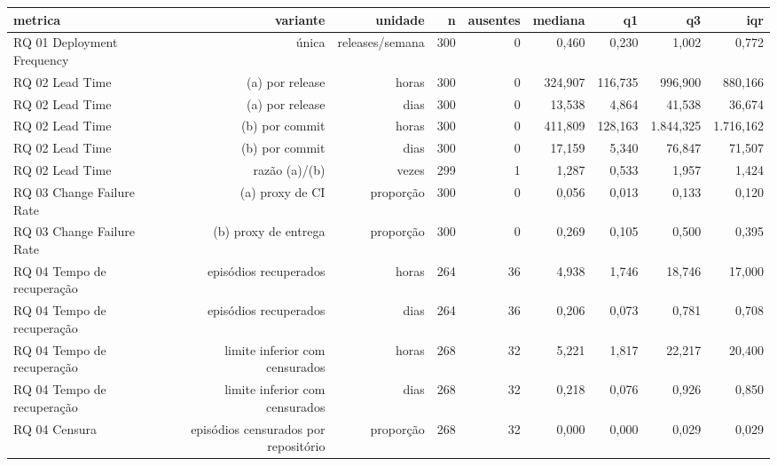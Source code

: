 \begin{tabular}{lrrrrrrrr}
\hline
metrica & variante & unidade & n & ausentes & mediana & q1 & q3 & iqr \\
\hline
RQ 01 Deployment Frequency & única & releases/semana & 300 & 0 & 0,460 & 0,230 & 1,002 & 0,772 \\
RQ 02 Lead Time & (a) por release & horas & 300 & 0 & 324,907 & 116,735 & 996,900 & 880,166 \\
RQ 02 Lead Time & (a) por release & dias & 300 & 0 & 13,538 & 4,864 & 41,538 & 36,674 \\
RQ 02 Lead Time & (b) por commit & horas & 300 & 0 & 411,809 & 128,163 & 1.844,325 & 1.716,162 \\
RQ 02 Lead Time & (b) por commit & dias & 300 & 0 & 17,159 & 5,340 & 76,847 & 71,507 \\
RQ 02 Lead Time & razão (a)/(b) & vezes & 299 & 1 & 1,287 & 0,533 & 1,957 & 1,424 \\
RQ 03 Change Failure Rate & (a) proxy de CI & proporção & 300 & 0 & 0,056 & 0,013 & 0,133 & 0,120 \\
RQ 03 Change Failure Rate & (b) proxy de entrega & proporção & 300 & 0 & 0,269 & 0,105 & 0,500 & 0,395 \\
RQ 04 Tempo de recuperação & episódios recuperados & horas & 264 & 36 & 4,938 & 1,746 & 18,746 & 17,000 \\
RQ 04 Tempo de recuperação & episódios recuperados & dias & 264 & 36 & 0,206 & 0,073 & 0,781 & 0,708 \\
RQ 04 Tempo de recuperação & limite inferior com censurados & horas & 268 & 32 & 5,221 & 1,817 & 22,217 & 20,400 \\
RQ 04 Tempo de recuperação & limite inferior com censurados & dias & 268 & 32 & 0,218 & 0,076 & 0,926 & 0,850 \\
RQ 04 Censura & episódios censurados por repositório & proporção & 268 & 32 & 0,000 & 0,000 & 0,029 & 0,029 \\
\hline
\end{tabular}
